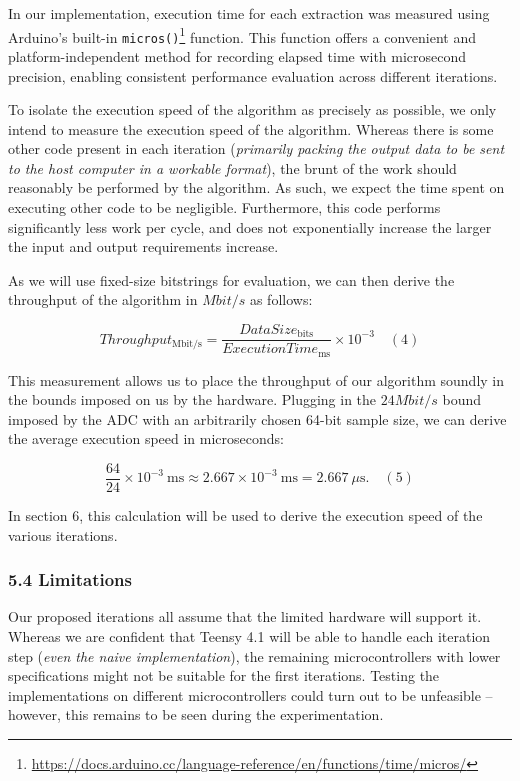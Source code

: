 In our implementation, execution time for each extraction was measured using Arduino's built-in \texttt{micros()}\footnote{\url{https://docs.arduino.cc/language-reference/en/functions/time/micros/}} function. This function offers a convenient and platform-independent method for recording elapsed time with microsecond precision, enabling consistent performance evaluation across different iterations.

To isolate the execution speed of the algorithm as precisely as possible, we only intend to measure the execution speed of the algorithm. Whereas there is some other code present in each iteration (\emph{primarily packing the output data to be sent to the host computer in a workable format}), the brunt of the work should reasonably be performed by the algorithm. As such, we expect the time spent on executing other code to be negligible. Furthermore, this code performs significantly less work per cycle, and does not exponentially increase the larger the input and output requirements increase.

As we will use fixed-size bitstrings for evaluation, we can then derive the throughput of the algorithm in \(Mbit/s\) as follows:

\[
Throughput_\mathrm{Mbit/s}
= \frac{DataSize_\mathrm{bits}}{ExecutionTime_\mathrm{ms}}
\times 10^{-3}
\phantom{12}(4)
\]

This measurement allows us to place the throughput of our algorithm soundly in the bounds imposed on us by the hardware. Plugging in the \(24 Mbit/s\) bound imposed by the ADC with an arbitrarily chosen 64-bit sample size, we can derive the average execution speed in microseconds:

\[
\frac{64}{24}\times10^{-3}\ \mathrm{ms}
\approx 2.667\times10^{-3}\ \mathrm{ms}
=2.667\ \mu\mathrm{s}.
\phantom{12}(5)
\]

In section 6, this calculation will be used to derive the execution speed of the various iterations.

\subsubsection{5.4 Limitations}\label{limitations}

Our proposed iterations all assume that the limited hardware will support it. Whereas we are confident that Teensy 4.1 will be able to handle each iteration step (\emph{even the naive implementation}), the remaining microcontrollers with lower specifications might not be suitable for the first iterations. Testing the implementations on different microcontrollers could turn out to be unfeasible -- however, this remains to be seen during the experimentation.

